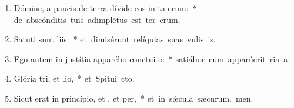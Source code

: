 \begin{flushleft}
\begin{enumerate}[leftmargin=*]
\item Dómine, a paucis de terra dívide eos in ta erum:~* \mbox{de abscónditis tuis adimplétus est ter erum.}
\item Satuti sunt liis:~* \mbox{et dimisérunt relíquias suas vulis is.}
\item Ego autem in justítia apparébo conctui o:~* \mbox{satiábor cum apparúerit ria a.}
\item Glória tri, et lio,~* \mbox{et Spitui cto.}
\item Sicut erat in princípio, et , et per,~* \mbox{et in s\'{\ae}cula sæcurum. men.}

\end{enumerate}
\end{flushleft}

